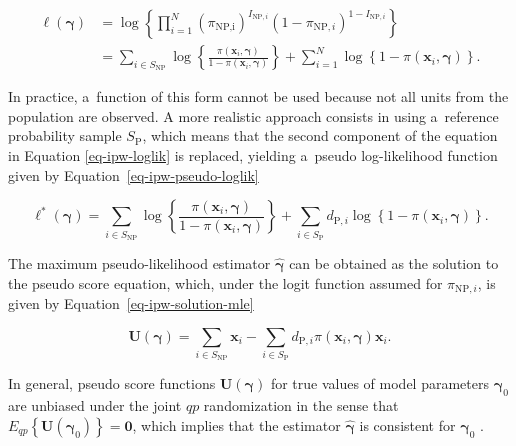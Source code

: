 \documentclass[
]{jss}
\begin{document}
\begin{equation}
\begin{aligned}
\ell(\boldsymbol{\gamma}) &= \log\left\{\prod_{i=1}^N \left(\pi_{\text{NP,i}}\right)^{I_{\text{NP},i}}\left(1-\pi_{\text{NP},i}\right)^{1-I_{\text{NP},i}}\right\} \\
&= \sum_{i \in S_{\text{NP}}} \log \left\{\frac{\pi\left(\boldsymbol{x}_i, \boldsymbol{\gamma}\right)}{1-\pi\left(\boldsymbol{x}_i, \boldsymbol{\gamma}\right)}\right\}+\sum_{i=1}^N \log \left\{1-\pi\left(\boldsymbol{x}_i, \boldsymbol{\gamma}\right)\right\}.
\end{aligned}
\label{eq-ipw-loglik}
\end{equation}

In practice, a~function of this form cannot be used because not all
units from the population are observed. A more realistic approach
consists in using a~reference probability sample \(S_{\text{P}}\), which
means that the second component of the equation in Equation
\ref{eq-ipw-loglik} is replaced, yielding a~pseudo log-likelihood
function given by Equation~\ref{eq-ipw-pseudo-loglik}

\begin{equation}
\ell^*(\boldsymbol{\gamma}) = \sum_{i \in S_{\text{NP}}} \log \left\{\frac{\pi\left(\boldsymbol{x}_i, \boldsymbol{\gamma}\right)}{1-\pi\left(\boldsymbol{x}_i, \boldsymbol{\gamma}\right)}\right\}+ \sum_{i \in S_{\text{P}}} d_{\text{P},i} \log \left\{1-\pi\left(\boldsymbol{x}_i, \boldsymbol{\gamma}\right)\right\}.
\label{eq-ipw-pseudo-loglik}
\end{equation}

The maximum pseudo-likelihood estimator \(\hat{\boldsymbol{\gamma}}\)
can be obtained as the solution to the pseudo score equation, which,
under the logit function assumed for \(\pi_{\text{NP},i}\), is given by
Equation~\ref{eq-ipw-solution-mle}

\begin{equation}
\boldsymbol{U}(\boldsymbol{\gamma}) = \sum_{i \in S_{\text{NP}}} \boldsymbol{x}_i - \sum_{i \in S_{\text{P}}} d_{\text{P},i} \pi(\boldsymbol{x}_i, \boldsymbol{\gamma}) \boldsymbol{x}_i.
\label{eq-ipw-solution-mle}
\end{equation}

In general, pseudo score functions
\(\boldsymbol{U}(\boldsymbol{\gamma})\) for true values of model
parameters \(\boldsymbol{\gamma}_0\) are unbiased under the joint
\(q p\) randomization in the sense that
\(E_{q p}\left\{\boldsymbol{U}\left(\boldsymbol{\gamma}_0\right)\right\}=\boldsymbol{0}\),
which implies that the estimator \(\hat{\boldsymbol{\gamma}}\) is
consistent for \(\boldsymbol{\gamma}_0\) \citep{wu2022statistical}.
\end{document}
